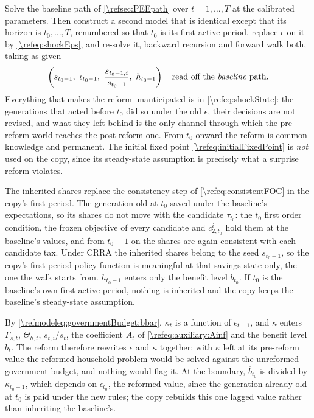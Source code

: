 Solve the baseline path of \cref{\refsec:PEEpath} over $t=1,\dots,T$ at the calibrated parameters. Then construct a second model that is identical except that its horizon is $t_0,\dots,T$, renumbered so that $t_0$ is its first active period, replace $\epsilon$ on it by \eqref{\refeq:shockEps}, and re-solve it, backward recursion and forward walk both, taking as given
\begin{align}\label{\refeq:shockState}
    \left(s_{t_0-1},\ \iota_{t_0-1},\ \frac{s_{t_0-1,i}}{s_{t_0-1}},\ h_{t_0-1}\right) \quad\text{read off the \emph{baseline} path.}
\end{align}
Everything that makes the reform unanticipated is in \eqref{\refeq:shockState}: the generations that acted before $t_0$ did so under the old $\epsilon$, their decisions are not revised, and what they left behind is the only channel through which the pre-reform world reaches the post-reform one. From $t_0$ onward the reform is common knowledge and permanent. The initial fixed point \eqref{\refeq:initialFixedPoint} is \emph{not} used on the copy, since its steady-state assumption is precisely what a surprise reform violates.

The inherited shares replace the consistency step of \eqref{\refeq:consistentFOC} in the copy's first period. The generation old at $t_0$ saved under the baseline's expectations, so its shares do not move with the candidate $\tau_{t_0}$: the $t_0$ first order condition, the frozen objective of every candidate and $c_{2,t_0}^i$ hold them at the baseline's values, and from $t_0+1$ on the shares are again consistent with each candidate tax. Under CRRA the inherited shares belong to the seed $s_{t_0-1}$, so the copy's first-period policy function is meaningful at that savings state only, the one the walk starts from. $h_{t_0-1}$ enters only the benefit level $\overline{b}_{t_0}$. If $t_0$ is the baseline's own first active period, nothing is inherited and the copy keeps the baseline's steady-state assumption.

By \eqref{\refmodeleq:governmentBudget:bbar}, $\kappa_t$ is a function of $\epsilon_{t+1}$, and $\kappa$ enters $\Gamma_{s,t}$, $\Theta_{h,t}$, $s_{t,i}/s_t$, the coefficient $A_t$ of \eqref{\refeq:auxiliary:Ainf} and the benefit level $\overline{b}_t$. The reform therefore rewrites $\epsilon$ and $\kappa$ together; with $\kappa$ left at its pre-reform value the reformed household problem would be solved against the unreformed government budget, and nothing would flag it. At the boundary, $\overline{b}_{t_0}$ is divided by $\kappa_{t_0-1}$, which depends on $\epsilon_{t_0}$, the reformed value, since the generation already old at $t_0$ is paid under the new rules; the copy rebuilds this one lagged value rather than inheriting the baseline's.

